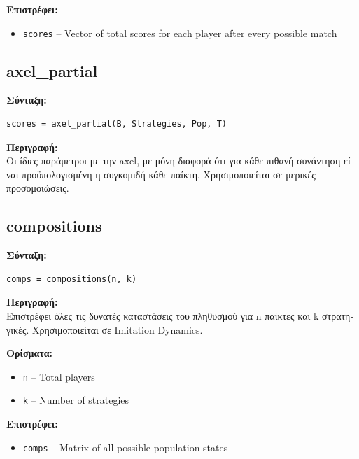 \documentclass[12pt]{report}
\begin{document}
\textbf{\foreignlanguage{greek}{Επιστρέφει}:}
\begin{itemize}
    \item \texttt{scores} – Vector of total scores for each player after every possible match
\end{itemize}

\subsection*{axel\_partial}

\textbf{\foreignlanguage{greek}{Σύνταξη}:}
\begin{verbatim}
scores = axel_partial(B, Strategies, Pop, T)
\end{verbatim}

\textbf{\foreignlanguage{greek}{Περιγραφή:}} \\
\foreignlanguage{greek}{
Οι ίδιες παράμετροι με την \foreignlanguage{english}{axel}, με μόνη διαφορά ότι για κάθε πιθανή συνάντηση είναι προϋπολογισμένη η συγκομιδή κάθε παίκτη. Χρησιμοποιείται σε μερικές προσομοιώσεις.}

\subsection*{compositions}

\textbf{\foreignlanguage{greek}{Σύνταξη}:}
\begin{verbatim}
comps = compositions(n, k)
\end{verbatim}

\textbf{\foreignlanguage{greek}{Περιγραφή:}} \\
\foreignlanguage{greek}{
Επιστρέφει όλες τις δυνατές καταστάσεις του πληθυσμού για \foreignlanguage{english}{n} παίκτες και \foreignlanguage{english}{k} στρατηγικές. Χρησιμοποιείται σε \foreignlanguage{english}{Imitation Dynamics}.}

\textbf{\foreignlanguage{greek}{Ορίσματα:}}
\begin{itemize}
    \item \texttt{n} – Total players
    \item \texttt{k} – Number of strategies
\end{itemize}

\textbf{\foreignlanguage{greek}{Επιστρέφει}:}
\begin{itemize}
    \item \texttt{comps} – Matrix of all possible population states
\end{itemize}
\end{document}
